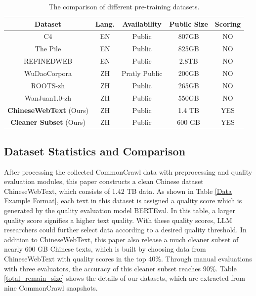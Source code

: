 \documentclass{article}
\begin{document}
 \begin{table}[htb]
\centering
     \caption{ The comparison of different pre-training datasets.}
    \label{Dataset Compare}
    \begin{tabular}{ccccc}
    \toprule
    \textbf{Dataset} & \textbf{Lang.} &\textbf{Availability}& \textbf{Pubilc Size} & \textbf{Scoring} \\
    \midrule
    C4\cite{2020T5C4}   & EN & Public &  807GB  & NO   \\  
    The Pile\cite{2020_pile} & EN & Public & 825GB  &   NO \\ 
    REFINEDWEB\cite{2023refinedweb} & EN & Public& 2.8TB    &  NO  \\
    WuDaoCorpora\cite{2021WuDaoCorpora}  & ZH & Pratly Public & 200GB  &  NO \\
    ROOTS-zh\cite{2023roots} & ZH & Public &  265GB   &  NO\\
    WanJuan1.0-zh\cite{2023wanjuan}   & ZH & Public & 550GB  & NO\\
    \textbf{ChineseWebText} (Ours)        & ZH & Public & 1.4 TB &  YES \\
    \textbf{Cleaner Subset} (Ours)        & ZH & Public & 600 GB &  YES \\
    \bottomrule
    \end{tabular}
   
\end{table}
 
 
\subsection{Dataset Statistics and Comparison}\label{dataset_statistics_comparison}


After processing the collected CommonCrawl data with preprocessing and quality evaluation modules, this paper constructs a clean Chinese dataset ChineseWebText, which consists of 1.42 TB data. As shown in Table \ref{Data Example Format}, each text in this dataset is assigned a quality score which is generated by the quality evaluation model BERTEval. In this table, a larger quality score signifies a higher text quality. With these quality scores, LLM researchers could further select data according to a desired quality threshold. In addition to ChineseWebText, this paper also release a much cleaner subset of nearly 600 GB Chinese texts, which is built by choosing data from ChineseWebText with quality scores in the top 40\%. Through manual evaluations with three evaluators, the accuracy of this cleaner subset reaches 90\%. Table \ref{total_remain_size} shows the details of our datasets, which are extracted from nine CommonCrawl snapshots. 
\end{document}
